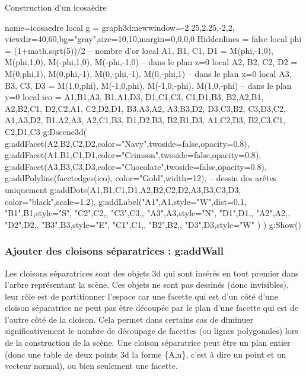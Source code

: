 \begin{demo}{Construction d'un icosaèdre}
\begin{luadraw}{name=icosaedre}
local g = graph3d:new{window={-2.25,2.25,-2,2}, viewdir={40,60},bg="gray",size={10,10},margin={0,0,0,0}}
Hiddenlines = false
local phi = (1+math.sqrt(5))/2 -- nombre d'or
local A1, B1, C1, D1 = M(phi,-1,0), M(phi,1,0), M(-phi,1,0), M(-phi,-1,0) -- dans le plan z=0
local A2, B2, C2, D2 = M(0,phi,1), M(0,phi,-1), M(0,-phi,-1), M(0,-phi,1) -- dans le plan x=0
local A3, B3, C3, D3 = M(1,0,phi), M(-1,0,phi), M(-1,0,-phi), M(1,0,-phi) -- dans le plan y=0
local ico = {   {A1,B1,A3}, {B1,A1,D3}, {D1,C1,C3}, {C1,D1,B3},
                {B2,A2,B1}, {A2,B2,C1}, {D2,C2,A1}, {C2,D2,D1},
                {B3,A3,A2}, {A3,B3,D2}, {D3,C3,B2}, {C3,D3,C2},
                {A1,A3,D2}, {B1,A2,A3}, {A2,C1,B3}, {D1,D2,B3},
                {B2,B1,D3}, {A1,C2,D3}, {B2,C3,C1}, {C2,D1,C3}  }
g:Dscene3d(
    g:addFacet({A2,B2,C2,D2},{color="Navy",twoside=false,opacity=0.8}),
    g:addFacet({A1,B1,C1,D1},{color="Crimson",twoside=false,opacity=0.8}),
    g:addFacet({A3,B3,C3,D3},{color="Chocolate",twoside=false,opacity=0.8}),
    g:addPolyline(facetedges(ico), {color="Gold",width=12}), -- dessin des arêtes uniquement
    g:addDots({A1,B1,C1,D1,A2,B2,C2,D2,A3,B3,C3,D3}, {color="black",scale=1.2}),
    g:addLabel("A1",A1,{style="W",dist=0.1}, "B1",B1,{style="S"}, "C2",C2,{}, "C3",C3,{}, "A3",A3,{style="N"}, "D1",D1,{},  "A2",A2,{},  "D2",D2,{}, "B3",B3,{style="E"}, "C1",C1,{}, "B2",B2,{}, "D3",D3,{style="W"} )
)
g:Show()
\end{luadraw}
\end{demo}

\subsubsection{Ajouter des cloisons séparatrices : g:addWall}

Les cloisons séparatrices sont des objets 3d qui sont insérés en tout premier dans l'arbre représentant la scène. Ces objets ne sont pas dessinés (donc invisibles), leur rôle est de partitionner l'espace car une facette qui est d'un côté d'une cloison séparatrice ne peut pas être découpée par le plan d'une facette qui est de l'autre côté de la cloison. Cela permet dans certains cas de diminuer significativement le nombre de découpage de facettes (ou lignes polygonales) lors de la construction de la scène. Une cloison séparatrice peut être un plan entier (donc une table de deux points 3d la forme \{A,n\}, c'est à dire un point et un vecteur normal), ou bien seulement une facette.


